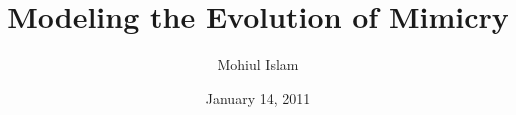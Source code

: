 \documentclass{beamer}
\title[Modeling the Evolution of Mimicry]{Modeling the Evolution of Mimicry}
\author{Mohiul Islam}
\institute{Concordia University}
\date{January 14, 2011}
\begin{document}
\frame{\titlepage}



\section[Outline]{}
\frame{\tableofcontents}







\end{document}
